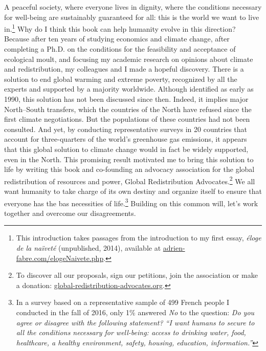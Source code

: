 \documentclass[a5paper,english,openany]{memoir}
\begin{document}
A peaceful society, where everyone lives in dignity, where the conditions necessary for well-being are sustainably guaranteed for all: this is the world we want to live in.\footnote{This introduction takes passages from the introduction to my first essay, \textit{éloge de la naïveté} (unpublished, 2014), available at \href{https://adrien-fabre.com/elogeNaivete.php}{adrien-fabre.com/elogeNaivete.php}.} Why do I think this book can help humanity evolve in this direction? Because after ten years of studying economics and climate change, after completing a Ph.D. on the conditions for the feasibility and acceptance of ecological moult, and focusing my academic research on opinions about climate and redistribution, my colleagues and I made a hopeful discovery. %
There is a solution to end global warming and extreme poverty, recognized by all the experts and supported by a majority worldwide. 
Although identified as early as 1990, this solution has not been discussed 
since then. Indeed, it implies major North--South transfers, which the countries of the North have refused since the first climate negotiations. But the populations of these countries had not been consulted. And yet, by conducting representative surveys in 20 countries that account for three-quarters of the world's greenhouse gas emissions, it appears that this global solution to climate change would in fact be widely supported, even in the North. 
This promising result motivated me to bring this solution to life by writing this book and co-founding an advocacy association for the global redistribution of resources and power, Global Redistribution Advocates.\footnote{To discover all our proposals, sign our petitions, join the association or make a donation: \href{http://global-redistribution-advocates.org/}{global-redistribution-advocates.org}.} %
We all want humanity to take charge of its own destiny and organize itself to ensure that everyone has the bas necessities of life.\footnote{In a survey based on a representative sample of 499 
French people I conducted in the fall of 2016, only 1\% answered \textit{No} to the question: \textit{Do you agree or disagree with the following statement? ``I want humans to secure to all the conditions necessary for well-being: access to drinking water, food, healthcare, a healthy environment, safety, housing, education, information.''}} 
Building on this common will, let's work together and overcome our disagreements.
\end{document}

